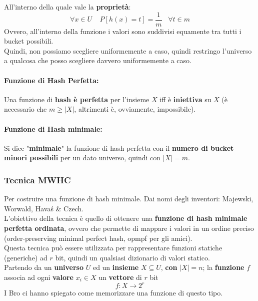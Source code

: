 All'interno della quale vale la \textbf{proprietà}:
$$ \forall x \in U \;\;\;\; P [h(x) = t] = \frac{1}{m} \;\;\; \forall t \in m$$
Ovvero, all'interno della funzione i valori sono suddivisi equamente tra tutti i bucket possibili.\\

Quindi, non possiamo scegliere uniformemente a caso, quindi restringo l'universo a qualcosa che posso scegliere davvero uniformemente a caso.\\

\paragraph{Funzione di Hash Perfetta:} Una funzione di \textbf{hash è perfetta} per l'insieme $X$ iff è \textbf{iniettiva} su $X$ (è necessario che $m \geq |X|$, altrimenti è, ovviamente, impossibile).\\

\paragraph{Funzione di Hash minimale:} Si dice "\textbf{minimale}" la funzione di hash perfetta con il \textbf{numero di bucket minori possibili} per un dato universo, quindi con $|X| = m$.\\

\newpage

\subsubsection{Tecnica MWHC}

Per costruire una funzione di hash minimale. Dai nomi degli inventori: Majewski, Worwald, Hava\'s \& Czech.\\ %

L'obiettivo della tecnica è quello di ottenere una \textbf{funzione di hash minimale perfetta ordinata}, ovvero che permette di mappare i valori in un ordine preciso (order-preserving minimal perfect hash, opmpf per gli amici).\\
Questa tecnica può essere utilizzata per rappresentare funzioni statiche (generiche) ad $r$ bit, quindi un qualsiasi dizionario di valori statico.\\

Partendo da un \textbf{universo} $U$ ed un \textbf{insieme} $X \subseteq U$, \textbf{con} $|X| = n$; la \textbf{funzione} $f$ associa ad ogni \textbf{valore} $x_i \in X$ un \textbf{vettore} di $r$ bit
$$ f: X \rightarrow 2^r $$
I Bro ci hanno spiegato come memorizzare una funzione di questo tipo.\\

